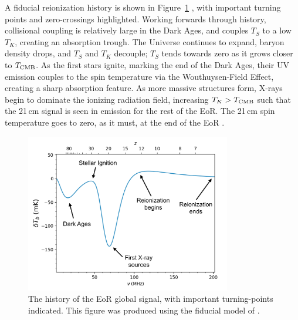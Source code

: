 A fiducial reionization history is shown in Figure~\ref{fig:eor_global_signal_sketch} \citep{Mirocha.12}, with important turning points and zero-crossings highlighted. Working forwards through history, collisional coupling is relatively large in the Dark Ages, and couples $T_S$ to a low $T_K$, creating an absorption trough. The Universe continues to expand, baryon density drops, and $T_S$ and $T_K$ decouple; $T_S$ tends towards zero as it grows closer to $T_{\rm CMB}$.
As the first stars ignite, marking the end of the Dark Ages, their UV emission couples to the spin temperature via the Wouthuysen-Field Effect, creating a sharp absorption feature. As more massive structures form, X-rays begin to dominate the ionizing radiation field, increasing $T_K > T_{\rm CMB}$ such that the 21\,cm signal is seen in emission for the rest of the EoR. The 21\,cm spin temperature goes to zero, as it must, at the end of the EoR \citep[e.g.][]{Pritchard.10, Rao.17}. 

\begin{figure}
\centering
\includegraphics[width=0.8\textwidth]{chapters/eor_intro/figures/ares_sketch.pdf}
\caption[The history of the EoR global signal.]{The history of the EoR global signal, with important turning-points indicated. This figure was produced using the fiducial model of \cite{Mirocha.12}.}
\label{fig:eor_global_signal_sketch}
\end{figure}

